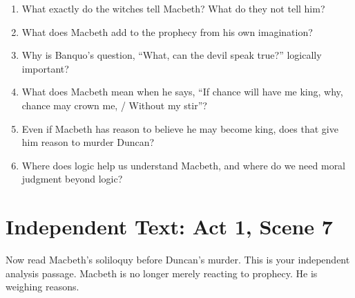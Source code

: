 \documentclass[12pt]{article}
\begin{document}
\begin{enumerate}[leftmargin=*]
\item What exactly do the witches tell Macbeth? What do they not tell him?
\item What does Macbeth add to the prophecy from his own imagination?
\item Why is Banquo's question, ``What, can the devil speak true?'' logically important?
\item What does Macbeth mean when he says, ``If chance will have me king, why, chance may crown me, / Without my stir''?
\item Even if Macbeth has reason to believe he may become king, does that give him reason to murder Duncan?
\item Where does logic help us understand Macbeth, and where do we need moral judgment beyond logic?
\end{enumerate}

\section*{Independent Text: Act 1, Scene 7}
Now read Macbeth's soliloquy before Duncan's murder. This is your independent analysis passage. Macbeth is no longer merely reacting to prophecy. He is weighing reasons.
\end{document}
